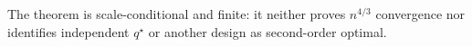 The theorem is scale-conditional and finite: it neither proves \(n^{4/3}\) convergence nor identifies independent \(q^\star\) or another design as second-order optimal.